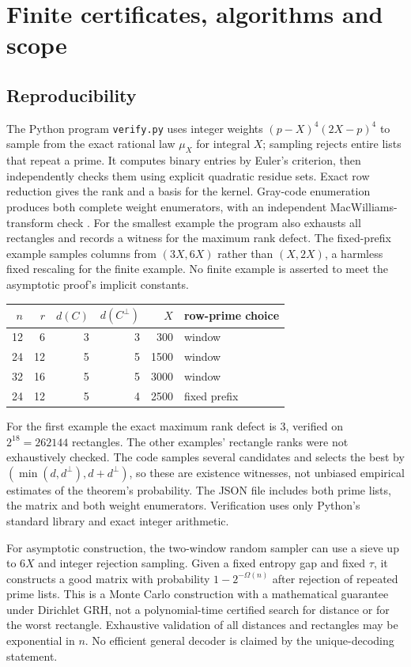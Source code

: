 \documentclass[11pt]{article}
\theoremstyle{remark}\newtheorem{remark}[theorem]{Remark}
\begin{document}
\section{Finite certificates, algorithms and scope}\label{sec:novelty}
\subsection{Reproducibility}
The Python program \texttt{verify.py} uses integer weights $(p-X)^4(2X-p)^4$ to sample from the exact rational law $\mu_X$ for integral $X$; sampling rejects entire lists that repeat a prime. It computes binary entries by Euler's criterion, then independently checks them using explicit quadratic residue sets. Exact row reduction gives the rank and a basis for the kernel. Gray-code enumeration produces both complete weight enumerators, with an independent MacWilliams-transform check \cite{ms}. For the smallest example the program also exhausts all rectangles and records a witness for the maximum rank defect. The fixed-prefix example samples columns from $(3X,6X)$ rather than $(X,2X)$, a harmless fixed rescaling for the finite example. No finite example is asserted to meet the asymptotic proof's implicit constants.

\begin{center}
\begin{tabular}{rrrrrl}
\toprule
$n$ & $r$ & $d(C)$ & $d(C^\perp)$ & $X$ & row-prime choice\\
\midrule
12 & 6 & 3 & 3 & 300 & window\\
24 & 12 & 5 & 5 & 1500 & window\\
32 & 16 & 5 & 5 & 3000 & window\\
24 & 12 & 5 & 4 & 2500 & fixed prefix\\
\bottomrule
\end{tabular}
\end{center}
For the first example the exact maximum rank defect is $3$, verified on $2^{18}=262144$ rectangles. The other examples' rectangle ranks were not exhaustively checked. The code samples several candidates and selects the best by $(\min(d,d^\perp),d+d^\perp)$, so these are existence witnesses, not unbiased empirical estimates of the theorem's probability. The JSON file includes both prime lists, the matrix and both weight enumerators. Verification uses only Python's standard library and exact integer arithmetic.

For asymptotic construction, the two-window random sampler can use a sieve up to $6X$ and integer rejection sampling. Given a fixed entropy gap and fixed $\tau$, it constructs a good matrix with probability $1-2^{-\Omega(n)}$ after rejection of repeated prime lists. This is a Monte Carlo construction with a mathematical guarantee under Dirichlet GRH, not a polynomial-time certified search for distance or for the worst rectangle. Exhaustive validation of all distances and rectangles may be exponential in $n$. No efficient general decoder is claimed by the unique-decoding statement.
\end{document}
